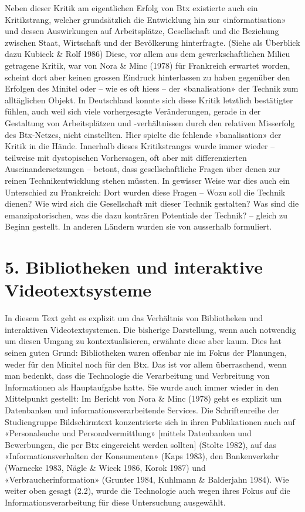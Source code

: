 \documentclass[a4paper,
fontsize=11pt,
oneside,
numbers=noperiodatend,
parskip=half-,
bibliography=totoc,
final
]{scrartcl}
\begin{document}
Neben dieser Kritik am eigentlichen Erfolg von Btx existierte auch ein
Kritikstrang, welcher grundsätzlich die Entwicklung hin zur
«informatisation» und dessen Auswirkungen auf Arbeitsplätze,
Gesellschaft und die Beziehung zwischen Staat, Wirtschaft und der
Bevölkerung hinterfragte. (Siehe als Überblick dazu Kubicek \& Rolf
1986) Diese, vor allem aus dem gewerkschaftlichen Milieu getragene
Kritik, war von Nora \& Minc (1978) für Frankreich erwartet worden,
scheint dort aber keinen grossen Eindruck hinterlassen zu haben
gegenüber den Erfolgen des Minitel oder -- wie es oft hiess -- der
«banalisation» der Technik zum alltäglichen Objekt. In Deutschland
konnte sich diese Kritik letztlich bestätigter fühlen, auch weil sich
viele vorhergesagte Veränderungen, gerade in der Gestaltung von
Arbeitsplätzen und -verhältnissen durch den relativen Misserfolg des
Btx-Netzes, nicht einstellten. Hier spielte die fehlende «banalisation»
der Kritik in die Hände. Innerhalb dieses Kritikstranges wurde immer
wieder -- teilweise mit dystopischen Vorhersagen, oft aber mit
differenzierten Auseinandersetzungen -- betont, dass gesellschaftliche
Fragen über denen zur reinen Technikentwicklung stehen müssten. In
gewisser Weise war dies auch ein Unterschied zu Frankreich: Dort wurden
diese Fragen -- Wozu soll die Technik dienen? Wie wird sich die
Gesellschaft mit dieser Technik gestalten? Was sind die
emanzipatorischen, was die dazu konträren Potentiale der Technik? --
gleich zu Beginn gestellt. In anderen Ländern wurden sie von ausserhalb
formuliert.

\hypertarget{bibliotheken-und-interaktive-videotextsysteme}{%
\section{5. Bibliotheken und interaktive
Videotextsysteme}\label{bibliotheken-und-interaktive-videotextsysteme}}

In diesem Text geht es explizit um das Verhältnis von Bibliotheken und
interaktiven Videotextsystemen. Die bisherige Darstellung, wenn auch
notwendig um diesen Umgang zu kontextualisieren, erwähnte diese aber
kaum. Dies hat seinen guten Grund: Bibliotheken waren offenbar nie im
Fokus der Planungen, weder für den Minitel noch für den Btx. Das ist vor
allem überraschend, wenn man bedenkt, dass die Technologie die
Verarbeitung und Verbreitung von Informationen als Hauptaufgabe hatte.
Sie wurde auch immer wieder in den Mittelpunkt gestellt: Im Bericht von
Nora \& Minc (1978) geht es explizit um Datenbanken und
informationsverarbeitende Services. Die Schriftenreihe der Studiengruppe
Bildschirmtext konzentrierte sich in ihren Publikationen auch auf
«Personalsuche und Personalvermittlung» {[}mittels Datenbanken und
Bewerbungen, die per Btx eingereicht werden sollten{]} (Stolte 1982),
auf das «Informationsverhalten der Konsumenten» (Kaps 1983), den
Bankenverkehr (Warnecke 1983, Nägle \& Wieck 1986, Korok 1987) und
«Verbraucherinformation» (Grunter 1984, Kuhlmann \& Balderjahn 1984).
Wie weiter oben gesagt (2.2), wurde die Technologie auch wegen ihres
Fokus auf die Informationsverarbeitung für diese Untersuchung
ausgewählt.
\end{document}
